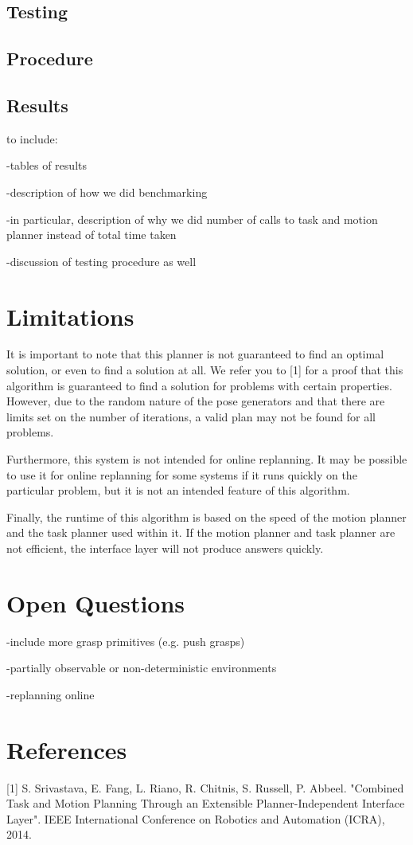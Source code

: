 \documentclass[12pt]{article}
\begin{document}
\subsection{Testing}

\subsection{Procedure}

\subsection{Results}

to include:

-tables of results

-description of how we did benchmarking

-in particular, description of why we did number of calls to task and motion planner instead of total time taken

-discussion of testing procedure as well

\section{Limitations}

It is important to note that this planner is not guaranteed to find an optimal solution, or even to find a solution at all.  
We refer you to [1] for a proof that this algorithm is guaranteed to find a solution for problems with certain properties.  
However, due to the random nature of the pose generators and that there are limits set on the number of iterations, a valid plan may not be found for all problems.  

Furthermore, this system is not intended for online replanning.  
It may be possible to use it for online replanning for some systems if it runs quickly on the particular problem, but it is not an intended feature of this algorithm.

Finally, the runtime of this algorithm is based on the speed of the motion planner and the task planner used within it.  
If the motion planner and task planner are not efficient, the interface layer will not produce answers quickly.

\section{Open Questions}

-include more grasp primitives (e.g. push grasps)

-partially observable or non-deterministic environments

-replanning online

\section{References}

[1] S. Srivastava, E. Fang, L. Riano, R. Chitnis, S. Russell, P. Abbeel. "Combined Task and Motion Planning Through an Extensible Planner-Independent Interface Layer". IEEE International Conference on Robotics and Automation (ICRA), 2014.
\end{document}
